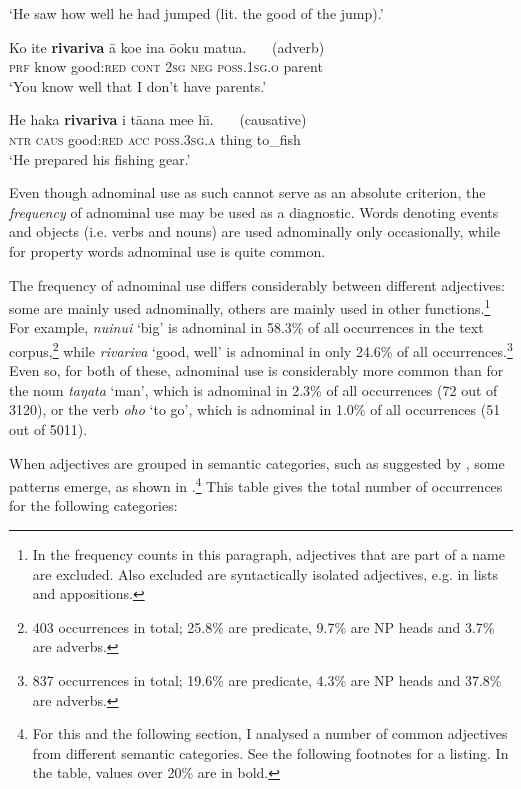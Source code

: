 \glt 
‘He saw how well he had jumped (lit. the good of the jump).’ \textstyleExampleref{[R408.025]} 
\z

\ea\label{ex:3.95}
\gll Ko {\ꞌ}ite \textbf{rivariva} {\ꞌ}ā koe {\ꞌ}ina ō{\ꞌ}oku matu{\ꞌ}a. ~~~\textup{(adverb)}\\
\textsc{prf} know good:\textsc{red} \textsc{cont} \textsc{2sg} \textsc{neg} \textsc{poss.1sg.o} parent \\

\glt 
‘You know well that I don’t have parents.’ \textstyleExampleref{[R214.013]} 
\z

\ea\label{ex:3.96}
\gll He haka \textbf{rivariva} i tā{\ꞌ}ana me{\ꞌ}e h{\=\i.} ~~~\textup{(causative)}\\
\textsc{ntr} \textsc{caus} good:\textsc{red} \textsc{acc} \textsc{poss.3sg.a} thing to\_fish \\

\glt 
‘He prepared his fishing gear.’ \textstyleExampleref{[R237.111]} 
\z

Even though adnominal use as such cannot serve as an absolute criterion, the \textit{frequency} of adnominal use may be used as a diagnostic. Words denoting events and objects (i.e. verbs and nouns) are used adnominally only occasionally, while for property words adnominal use is quite common. 

The frequency of adnominal use differs considerably between different adjectives: some are mainly used adnominally, others are mainly used in other functions.\footnote{\label{fn:122}In the frequency counts in this paragraph, adjectives that are part of a name are excluded. Also excluded are syntactically isolated adjectives, e.g. in lists and appositions.} For example, \textit{nuinui} ‘big’ is adnominal in 58.3\% of all occurrences in the text corpus,\footnote{\label{fn:123}403 occurrences in total; 25.8\% are predicate, 9.7\% are NP heads and 3.7\% are adverbs.} while \textit{rivariva} ‘good, well’ is adnominal in only 24.6\% of all occurrences.\footnote{\label{fn:124}837 occurrences in total; 19.6\% are predicate, 4.3\% are NP heads and 37.8\% are adverbs.} Even so, for both of these, adnominal use is considerably more common than for the noun \textit{taŋata} ‘man’, which is adnominal in 2.3\% of all occurrences (72 out of 3120), or the verb \textit{oho} ‘to go’, which is adnominal in 1.0\% of all occurrences (51 out of 5011).

When adjectives are grouped in semantic categories, such as suggested by \citet[73]{Dixon2010-2}, some patterns emerge, as shown in .\footnote{\label{fn:125}For this and the following section, I analysed a number of common adjectives from different semantic categories. See the following footnotes for a listing. In the table, values over 20\% are in bold.} This table gives the total number of occurrences for the following categories:

